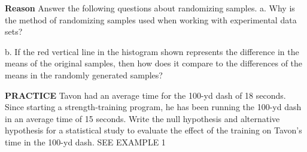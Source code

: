 \documentclass{article}
\newenvironment{practice}[2]{}{}        %
\newcommand{\answer}[1]{}               %
\newcommand{\placeholder}[2]{}          %
\begin{document}
\begin{practice}{11}{2}
\textbf{Reason} Answer the following questions about randomizing samples.
a. Why is the method of randomizing samples used when working with experimental data sets?
\answer{a. The process of randomizing samples, or rearranging data values in random order, allows you to estimate the difference between groups that arises due to natural variability. Then you can decide whether the data gives you enough evidence to support your hypothesis.}
b. If the red vertical line in the histogram shown represents the difference in the means of the original samples, then how does it compare to the differences of the means in the randomly generated samples?
\placeholder{graph}{Pale blue histogram. Horizontal Difference of Means from -2 to 2 every 0.5; vertical Frequency from 0 to 60 every 10. Eight half-unit bins, approximate heights 6,28,49,51,42,23,17,9. Red vertical line near -0.85 in bin -1 to -0.5. No arrows.}
\answer{b. The red vertical line is in an area of the distribution with many data values. Many samples have a larger difference between means, so the difference in the means of the original sample groups is likely to be due solely to natural variation.}
\end{practice}
\begin{practice}{12}{2}
\textbf{PRACTICE} Tavon had an average time for the 100-yd dash of 18 seconds. Since starting a strength-training program, he has been running the 100-yd dash in an average time of 15 seconds. Write the null hypothesis and alternative hypothesis for a statistical study to evaluate the effect of the training on Tavon's time in the 100-yd dash. SEE EXAMPLE 1
\answer{Null hypothesis: The strength training did not improve the runner's speed in the 100-yd dash, (H_0:\mu\geq18). Alternative hypothesis: The strength training improved the player's speed in the 100-yd dash, (H_a:\mu<18).}
\end{practice}
\end{document}
